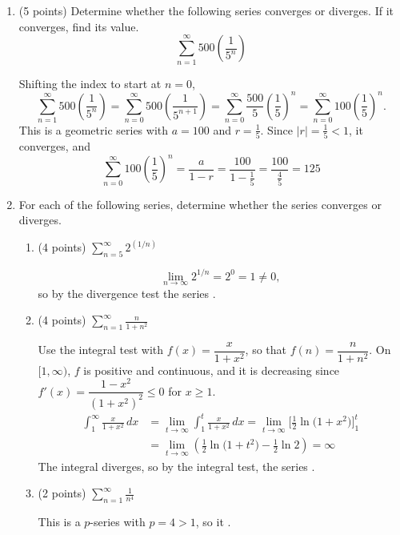 \documentclass[12pt]{article}
\newcommand{\ds}{\displaystyle}
\begin{document}
\begin{enumerate}
\item (5 points) Determine whether the following series converges or
  diverges. If it converges, find its value.
  \[
    \sum_{n=1}^{\infty} 500 \left( \frac{1}{5^n} \right)
  \]
  \begin{solution}
    Shifting the index to start at $n = 0$,
    \[
      \sum_{n=1}^{\infty} 500 \left( \frac{1}{5^n} \right)
      = \sum_{n=0}^{\infty} 500 \left( \frac{1}{5^{n+1}} \right)
      = \sum_{n=0}^{\infty} \frac{500}{5} \left( \frac15 \right)^{n}
      = \sum_{n=0}^{\infty} 100 \left( \frac15 \right)^{n}.
    \]
    This is a geometric series with $a = 100$ and $r = \frac15$. Since $|r| = \frac15 < 1$,
    it converges, and
    \[
      \sum_{n=0}^{\infty} 100 \left( \frac15 \right)^{n} = \frac{a}{1-r} = \frac{100}{1 - \frac15}
      = \frac{100}{\frac45} = \boxed{125}
    \]
  \end{solution}
  \vfill

  \newpage
  
\item For each of the following series, determine whether the series converges or diverges.
  \begin{enumerate}
  \item (4 points) $\ds \sum_{n=5}^{\infty} 2^{(1/n)}$
    \begin{solution}
      \[
        \lim_{n\to\infty} 2^{1/n} = 2^0 = 1 \neq 0,
      \]
      so by the divergence test the series .
    \end{solution}
    \vfill
    
  \item (4 points) $\ds \sum_{n=1}^{\infty} \frac{n}{1+n^2}$
    \begin{solution}
      Use the integral test with $f(x) = \dfrac{x}{1+x^2}$, so that $f(n) = \dfrac{n}{1+n^2}$.
      On $[1,\infty)$, $f$ is positive and continuous, and it is decreasing since
      $f'(x) = \dfrac{1-x^2}{(1+x^2)^2} \le 0$ for $x \ge 1$.
      \begin{align*}
        \int_1^\infty \frac{x}{1+x^2}\,dx
          &= \lim_{t\to\infty} \int_1^t \frac{x}{1+x^2}\,dx
           = \lim_{t\to\infty} \Big[ \tfrac12 \ln\!\big(1+x^2\big) \Big]_1^t \\[4pt]
          &= \lim_{t\to\infty} \left( \tfrac12 \ln\!\big(1+t^2\big) - \tfrac12 \ln 2 \right) = \infty
      \end{align*}
      The integral diverges, so by the integral test, the series .
    \end{solution}
    \vfill
    \vfill
    
  \item (2 points) $\ds \sum_{n=1}^{\infty} \frac{1}{n^4}$
    \begin{solution}
      This is a $p$-series with $p = 4 > 1$, so it .
    \end{solution}
    \vfill
  \end{enumerate}

\end{enumerate}
\end{document}
